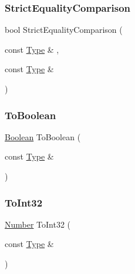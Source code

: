 \mbox{\label{class_type_aca07020739c6731d8f674adc21e97edd}} 
\subsubsection{\texorpdfstring{Strict\+Equality\+Comparison}{StrictEqualityComparison}}
{\footnotesize\ttfamily bool Strict\+Equality\+Comparison (\begin{DoxyParamCaption}\item[{const \hyperlink{class_type}{Type} \&}]{,  }\item[{const \hyperlink{class_type}{Type} \&}]{ }\end{DoxyParamCaption})\hspace{0.3cm}{\ttfamily [friend]}}

\mbox{\label{class_type_ac4625c21a844f06bfb4d4fe0d90ab781}} 
\subsubsection{\texorpdfstring{To\+Boolean}{ToBoolean}}
{\footnotesize\ttfamily \hyperlink{struct_boolean}{Boolean} To\+Boolean (\begin{DoxyParamCaption}\item[{const \hyperlink{class_type}{Type} \&}]{ }\end{DoxyParamCaption})\hspace{0.3cm}{\ttfamily [friend]}}

\mbox{\label{class_type_a95e159f5fe19a5aa297da9d7d06347da}} 
\subsubsection{\texorpdfstring{To\+Int32}{ToInt32}}
{\footnotesize\ttfamily \hyperlink{struct_number}{Number} To\+Int32 (\begin{DoxyParamCaption}\item[{const \hyperlink{class_type}{Type} \&}]{ }\end{DoxyParamCaption})\hspace{0.3cm}{\ttfamily [friend]}}

